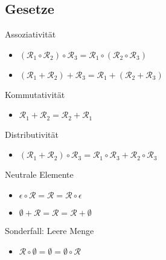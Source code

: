 \documentclass[]{beamer}
\begin{document}
\subsection{Gesetze}
\begin{frame}[squeeze]{}
  \begin{block}{Assoziativität}
    \begin{itemize}
      \item $\left( \mathcal{R}_1 \circ \mathcal{R}_2 \right) \circ \mathcal{R}_3 = \mathcal{R}_1 \circ \left( \mathcal{R}_2 \circ \mathcal{R}_3 \right)$
      \pause
      \item $\left( \mathcal{R}_1 + \mathcal{R}_2 \right) + \mathcal{R}_3 = \mathcal{R}_1 + \left( \mathcal{R}_2 + \mathcal{R}_3 \right)$
    \end{itemize}
  \end{block}
  
  \pause
  
  \begin{block}{Kommutativität}
    \begin{itemize}
      \item $\mathcal{R}_1 + \mathcal{R}_2 = \mathcal{R}_2 + \mathcal{R}_1$
    \end{itemize}
  \end{block}
  
  \pause
  
  \begin{block}{Distributivität}
    \begin{itemize}
      \item $(\mathcal{R}_1 + \mathcal{R}_2) \circ \mathcal{R}_3 = \mathcal{R}_1 \circ \mathcal{R}_3 + \mathcal{R}_2 \circ \mathcal{R}_3$
    \end{itemize}
  \end{block}
  
  \pause
  
  \begin{block}{Neutrale Elemente}
    \begin{itemize}
      \item $\epsilon \circ \mathcal{R} = \mathcal{R} = \mathcal{R} \circ \epsilon$
      \pause
      \item $\emptyset + \mathcal{R} = \mathcal{R} = \mathcal{R} + \emptyset$
    \end{itemize}
  \end{block}
  
  \pause
  
  \begin{alertblock}{Sonderfall: Leere Menge}
    \begin{itemize}
      \item $\mathcal{R} \circ \emptyset = \emptyset = \emptyset \circ \mathcal{R}$
    \end{itemize}
  \end{alertblock}
\end{frame}
\end{document}
